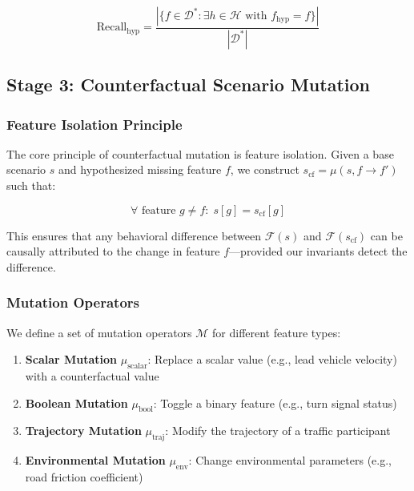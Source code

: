 \documentclass[conference]{IEEEtran}
\theoremstyle{plain}
\newcommand{\sys}{\mathcal{F}}
\begin{document}
\begin{equation}
\text{Recall}_{\text{hyp}} = \frac{|\{f \in \mathcal{D}^*: \exists h \in \mathcal{H} \text{ with } f_{\text{hyp}} = f\}|}{|\mathcal{D}^*|}
\label{eq:hyp_recall}
\end{equation}

\subsection{Stage 3: Counterfactual Scenario Mutation}

\subsubsection{Feature Isolation Principle}

The core principle of counterfactual mutation is feature isolation. Given a base scenario $s$ and hypothesized missing feature $f$, we construct $s_{\text{cf}} = \mu(s, f \rightarrow f')$ such that:

\begin{equation}
\forall \text{ feature } g \neq f: \; s[g] = s_{\text{cf}}[g]
\label{eq:feature_isolation}
\end{equation}

This ensures that any behavioral difference between $\sys(s)$ and $\sys(s_{\text{cf}})$ can be causally attributed to the change in feature $f$---provided our invariants detect the difference.

\subsubsection{Mutation Operators}

We define a set of mutation operators $\mathcal{M}$ for different feature types:

\begin{enumerate}[nosep]
    \item \textbf{Scalar Mutation} $\mu_{\text{scalar}}$: Replace a scalar value (e.g., lead vehicle velocity) with a counterfactual value
    \item \textbf{Boolean Mutation} $\mu_{\text{bool}}$: Toggle a binary feature (e.g., turn signal status)
    \item \textbf{Trajectory Mutation} $\mu_{\text{traj}}$: Modify the trajectory of a traffic participant
    \item \textbf{Environmental Mutation} $\mu_{\text{env}}$: Change environmental parameters (e.g., road friction coefficient)
\end{enumerate}
\end{document}
